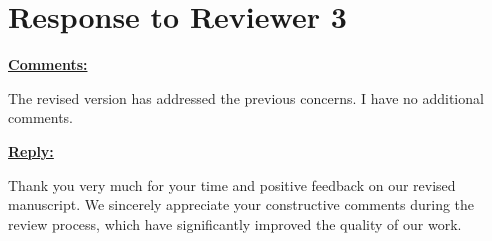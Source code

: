 \section*{Response to Reviewer 3}\label{par:r3}
{\large

\noindent \underline{\textbf{Comments:}}

The revised version has addressed the previous concerns. I have no additional comments.

{\color{blue}
\noindent \underline{\textbf{Reply:}}

Thank you very much for your time and positive feedback on our revised manuscript. We sincerely appreciate your constructive comments during the review process, which have significantly improved the quality of our work.
}%
}